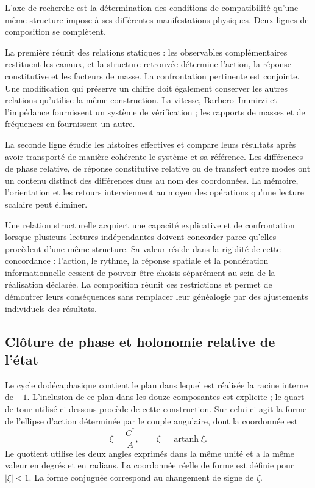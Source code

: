 L’axe de recherche est la détermination des conditions de
compatibilité qu’une même structure impose à ses différentes
manifestations physiques. Deux lignes de composition se complètent.

La première réunit des relations statiques : les observables complémentaires
restituent les canaux, et la structure retrouvée détermine l’action,
la réponse constitutive et les facteurs de masse. La confrontation pertinente
est conjointe. Une modification qui préserve un chiffre doit également conserver
les autres relations qu’utilise la même construction. La vitesse,
Barbero--Immirzi et l’impédance fournissent un système de vérification ;
les rapports de masses et de fréquences en fournissent un autre.

La seconde ligne étudie les histoires effectives et compare leurs résultats
après avoir transporté de manière cohérente le système et sa référence. Les
différences de phase relative, de réponse constitutive relative ou de transfert
entre modes ont un contenu distinct des différences dues au
nom des coordonnées. La mémoire, l’orientation et les retours
interviennent au moyen des opérations qu’une lecture scalaire peut éliminer.

Une relation structurelle acquiert une capacité explicative et de confrontation
lorsque plusieurs lectures indépendantes doivent concorder parce qu’elles procèdent d’une
même structure. Sa valeur réside dans la rigidité de cette concordance :
l’action, le rythme, la réponse spatiale et la pondération informationnelle cessent de
pouvoir être choisis séparément au sein de la réalisation déclarée. La
composition réunit ces restrictions et permet de démontrer leurs conséquences
sans remplacer leur généalogie par des ajustements individuels des résultats.

\subsection{Clôture de phase et holonomie relative de l’état}
\label{subsec:narrativa-holonomia-relativa}

Le cycle dodécaphasique contient le plan dans lequel est réalisée la racine
interne de $-1$. L’inclusion de ce plan dans les douze composantes est
explicite ; le quart de tour utilisé ci-dessous procède de cette
construction. Sur celui-ci agit la forme de l’ellipse d’action déterminée
par le couple angulaire, dont la coordonnée est
\begin{equation}
 \xi=\frac{C^*}{A},\qquad
 \zeta=\operatorname{artanh}\xi.
 \label{eq:narrativa-coordenada-forma}
\end{equation}
Le quotient utilise les deux angles exprimés dans la même unité et a
la même valeur en degrés et en radians. La coordonnée réelle de forme est
définie pour $|\xi|<1$. La forme conjuguée correspond au
changement de signe de $\zeta$.

